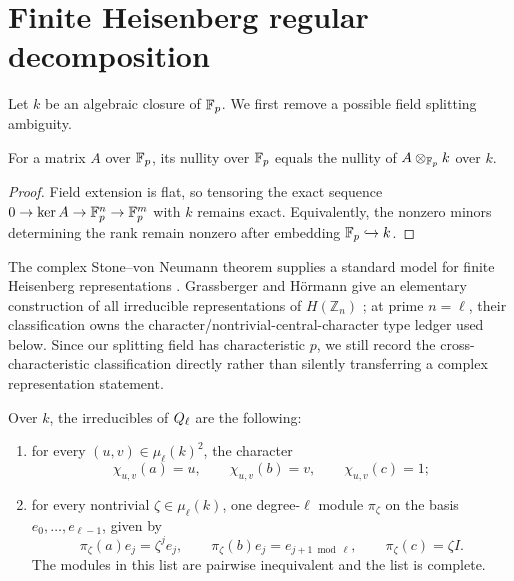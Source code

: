\section{Finite Heisenberg regular decomposition}

Let $k$ be an algebraic closure of $\mathbb F_p$.  We first remove a possible field
splitting ambiguity.

\begin{lemma}\label{lem:base-change}
For a matrix $A$ over $\mathbb F_p$, its nullity over $\mathbb F_p$ equals the nullity of
$A\otimes_{\mathbb F_p}k$ over $k$.
\end{lemma}

\begin{proof}
Field extension is flat, so tensoring the exact sequence
$0\to\ker A\to\mathbb F_p^n\to\mathbb F_p^m$ with $k$ remains exact.  Equivalently, the
nonzero minors determining the rank remain nonzero after embedding
$\mathbb F_p\hookrightarrow k$.
\end{proof}

The complex Stone--von Neumann theorem supplies a standard model for finite
Heisenberg representations \citep{GurevichHadani2010}.  Grassberger and
H\"ormann give an elementary construction of all irreducible representations
of $H(\mathbb{Z}_n)$ \citep{GrassbergerHormann2001}; at prime $n=\ell$, their
classification owns the character/nontrivial-central-character type ledger
used below.  Since our splitting field has characteristic $p$, we still record
the cross-characteristic classification directly rather than silently
transferring a complex representation statement.

\begin{lemma}\label{lem:irreducibles}
Over $k$, the irreducibles of $Q_\ell$ are the following:
\begin{enumerate}
\item for every $(u,v)\in\mu_\ell(k)^2$, the character
\[
 \chi_{u,v}(a)=u,\qquad \chi_{u,v}(b)=v,\qquad \chi_{u,v}(c)=1;
\]
\item for every nontrivial $\zeta\in\mu_\ell(k)$, one degree-$\ell$ module
$\pi_\zeta$ on the basis $e_0,\ldots,e_{\ell-1}$, given by
\[
 \pi_\zeta(a)e_j=\zeta^j e_j,
 \qquad
 \pi_\zeta(b)e_j=e_{j+1\bmod\ell},
 \qquad
 \pi_\zeta(c)=\zeta I.
\]
The modules in this list are pairwise inequivalent and the list is complete.
\end{enumerate}
\end{lemma}

